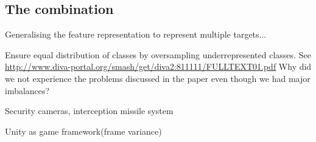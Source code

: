 \subsection{The combination}




Generalising the feature representation to represent multiple targets...

Ensure equal distribution of classes by oversampling underrepresented classes. See \url{http://www.diva-portal.org/smash/get/diva2:811111/FULLTEXT01.pdf} Why did we not experience the problems discussed in the paper even though we had major imbalances?

Security cameras, interception missile system

Unity as game framework(frame variance)